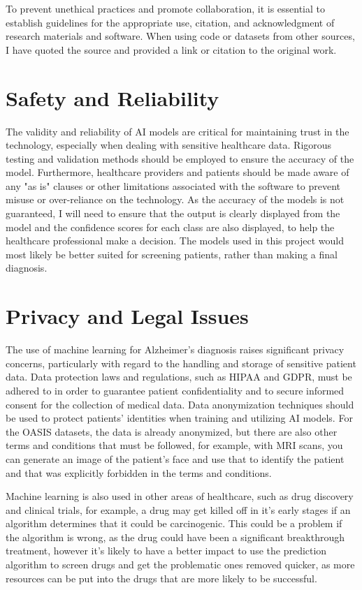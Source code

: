 \documentclass[]{final_report}
\begin{document}
To prevent unethical practices and promote collaboration, it is essential to establish guidelines for the appropriate use, citation, and acknowledgment of research materials and software. When using code or datasets from other sources, I have quoted the source and provided a link or citation to the original work.

\section{Safety and Reliability}

The validity and reliability of AI models are critical for maintaining trust in the technology, especially when dealing with sensitive healthcare data. Rigorous testing and validation methods should be employed to ensure the accuracy of the model. Furthermore, healthcare providers and patients should be made aware of any "as is" clauses or other limitations associated with the software to prevent misuse or over-reliance on the technology. As the accuracy of the models is not guaranteed, I will need to ensure that the output is clearly displayed from the model and the confidence scores for each class are also displayed, to help the healthcare professional make a decision. The models used in this project would most likely be better suited for screening patients, rather than making a final diagnosis.

\section{Privacy and Legal Issues}

The use of machine learning for Alzheimer's diagnosis raises significant privacy concerns, particularly with regard to the handling and storage of sensitive patient data. Data protection laws and regulations, such as HIPAA and GDPR, must be adhered to in order to guarantee patient confidentiality and to secure informed consent for the collection of medical data. Data anonymization techniques should be used to protect patients' identities when training and utilizing AI models. For the OASIS datasets, the data is already anonymized, but there are also other terms and conditions that must be followed, for example, with MRI scans, you can generate an image of the patient's face and use that to identify the patient and that was explicitly forbidden in the terms and conditions.

Machine learning is also used in other areas of healthcare, such as drug discovery and clinical trials, for example, a drug may get killed off in it's early stages if an algorithm determines that it could be carcinogenic. This could be a problem if the algorithm is wrong, as the drug could have been a significant breakthrough treatment, however it's likely to have a better impact to use the prediction algorithm to screen drugs and get the problematic ones removed quicker, as more resources can be put into the drugs that are more likely to be successful.\cite{10.3389/frai.2021.757780}
\end{document}
